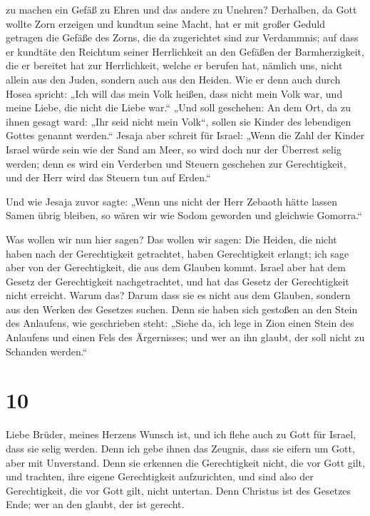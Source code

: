 zu machen ein Gefäß zu Ehren und das andere zu Unehren? 
Derhalben, da Gott wollte Zorn erzeigen und kundtun seine Macht, hat er
mit großer Geduld getragen die Gefäße des Zorns, die da zugerichtet sind
zur Verdammnis;  auf dass er kundtäte den Reichtum seiner
Herrlichkeit an den Gefäßen der Barmherzigkeit, die er bereitet hat zur
Herrlichkeit,  welche er berufen hat, nämlich uns, nicht
allein aus den Juden, sondern auch aus den Heiden.  Wie
er denn auch durch Hosea spricht: „Ich will das mein Volk heißen, dass
nicht mein Volk war, und meine Liebe, die nicht die Liebe war.``
 „Und soll geschehen: An dem Ort, da zu ihnen gesagt
ward: „Ihr seid nicht mein Volk``, sollen sie Kinder des lebendigen
Gottes genannt werden.``  Jesaja aber schreit für Israel:
„Wenn die Zahl der Kinder Israel würde sein wie der Sand am Meer, so
wird doch nur der Überrest selig werden;  denn es wird
ein Verderben und Steuern geschehen zur Gerechtigkeit, und der Herr wird
das Steuern tun auf Erden.``

 Und wie Jesaja zuvor sagte: „Wenn uns nicht der Herr
Zebaoth hätte lassen Samen übrig bleiben, so wären wir wie Sodom
geworden und gleichwie Gomorra.``

 Was wollen wir nun hier sagen? Das wollen wir sagen: Die
Heiden, die nicht haben nach der Gerechtigkeit getrachtet, haben
Gerechtigkeit erlangt; ich sage aber von der Gerechtigkeit, die aus dem
Glauben kommt.  Israel aber hat dem Gesetz der
Gerechtigkeit nachgetrachtet, und hat das Gesetz der Gerechtigkeit nicht
erreicht.  Warum das? Darum dass sie es nicht aus dem
Glauben, sondern aus den Werken des Gesetzes suchen. Denn sie haben sich
gestoßen an den Stein des Anlaufens,  wie geschrieben
steht: „Siehe da, ich lege in Zion einen Stein des Anlaufens und einen
Fels des Ärgernisses; und wer an ihn glaubt, der soll nicht zu Schanden
werden.``

\hypertarget{section-9}{%
\section{10}\label{section-9}}

 Liebe Brüder, meines Herzens Wunsch ist, und ich flehe
auch zu Gott für Israel, dass sie selig werden.  Denn ich
gebe ihnen das Zeugnis, dass sie eifern um Gott, aber mit Unverstand.
 Denn sie erkennen die Gerechtigkeit nicht, die vor Gott
gilt, und trachten, ihre eigene Gerechtigkeit aufzurichten, und sind
also der Gerechtigkeit, die vor Gott gilt, nicht untertan.
 Denn Christus ist des Gesetzes Ende; wer an den glaubt,
der ist gerecht.

